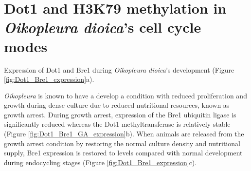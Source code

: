 \documentclass[11pt,twoside,a4paper]{report}
\begin{document}
\clearpage
\section{Dot1 and H3K79 methylation in \textit{Oikopleura dioica}'s cell cycle modes}
	
	Expression of Dot1 and Bre1 during \textit{Oikopleura dioica}'s development (Figure \ref{fig:Dot1_Bre1_expression}a).
	
	\textit{Oikopleura} is known to have a develop a condition with reduced proliferation and growth during dense culture due to reduced nutritional resources, known as growth arrest.  During growth arrest, expression of the Bre1 ubiquitin ligase is significantly reduced whereas the Dot1 methyltransferase is relatively stable (Figure \ref{fig:Dot1_Bre1_GA_expression}b). When animals are released from the growth arrest condition by restoring the normal culture density and nutritional supply, Bre1 expression is restored to levels compared with normal development during endocycling stages (Figure \ref{fig:Dot1_Bre1_expression}c).	
	
\end{document}
